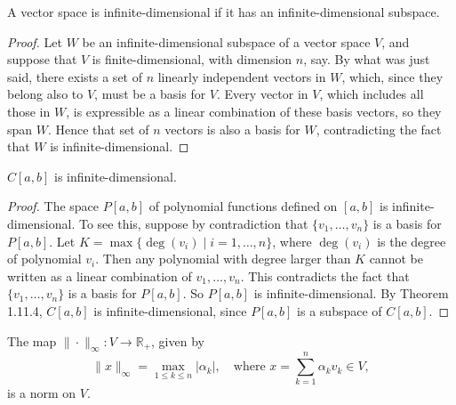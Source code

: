 \begin{theorem}
A vector space is infinite-dimensional if it has an infinite-dimensional subspace. 
\end{theorem}
\begin{proof}
    Let \( W \) be an infinite-dimensional subspace of a vector space \( V \), and suppose that \( V \) is finite-dimensional, with dimension \( n \), say. By what was just said, there exists a set of \( n \) linearly independent vectors in \( W \), which, since they belong also to \( V \), must be a basis for \( V \). Every vector in \( V \), which includes all those in \( W \), is expressible as a linear combination of these basis vectors, so they span \( W \). Hence that set of \( n \) vectors is also a basis for \( W \), contradicting the fact that \( W \) is infinite-dimensional.
\end{proof}

\begin{proposition}
    \( C[a,b] \) is infinite-dimensional. 
\end{proposition}



\begin{proof}
The space \( P[a,b] \) of polynomial functions defined on \( [a,b] \) is infinite-dimensional. To see this, suppose by contradiction that \( \{v_1, \ldots, v_n\} \) is a basis for \( P[a,b] \). Let \( K = \max \{ \deg(v_i) \mid i = 1, \ldots, n \} \), where \( \deg(v_i) \) is the degree of polynomial \( v_i \). Then any polynomial with degree larger than \( K \) cannot be written as a linear combination of \( v_1, \ldots, v_n \). This contradicts the fact that \( \{v_1, \ldots, v_n\} \) is a basis for \( P[a,b] \). So \( P[a,b] \) is infinite-dimensional. By Theorem 1.11.4, \( C[a,b] \) is infinite-dimensional, since \( P[a,b] \) is a subspace of \( C[a,b] \).
\end{proof}


\begin{theorem}
The map \( \|\cdot\|_{\infty}: V \rightarrow \mathbb{R}_+ \), given by
\[
\|x\|_{\infty} = \max_{1 \leq k \leq n} |\alpha_k|, \quad \text{where } x = \sum_{k=1}^{n} \alpha_k v_k \in V,
\]
is a norm on \( V \).
\end{theorem}

